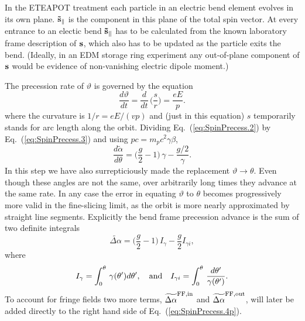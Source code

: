 \documentclass[]{article}
\begin{document}
In the ETEAPOT treatment each particle in an electric bend
element evolves in its own plane. 
${\bf \tilde s}_{\parallel}$ is the component in this plane of the total
spin vector. At every entrance to an electic bend ${\bf \tilde s}_{\parallel}$
has to be calculated from the known laboratory frame description
of ${\bf s}$, which also has to be updated as the particle exits
the bend. (Ideally, in an EDM storage ring experiment any out-of-plane
component of ${\bf s}$ would be evidence of non-vanishing electric dipole
moment.) 

The precession rate of $\vartheta$ is governed by the equation
%
\begin{equation}
\frac{d\vartheta}{dt}
 =
\frac{d}{dt}\,\bigg(\frac{s}{r}\bigg)
 =
\frac{eE}{p}.
\label{eq:SpinPrecess.3}
\end{equation}
%
where the curvature is $1/r=eE/(v p)$ and
(just in this equation) $s$ temporarily stands for arc
length along the orbit. Dividing Eq.~(\ref{eq:SpinPrecess.2})
by Eq.~(\ref{eq:SpinPrecess.3}) and using $pc=m_pc^2\gamma\beta$,
%
\begin{equation}
\boxed{
\frac{d\tilde\alpha}{d\theta}
 =
\bigg(
\frac{g}{2} - 1
\bigg)\,\gamma
 -\frac{g/2}{\gamma}
.
\label{eq:SpinPrecess.4}
}
\end{equation}
%
In this step we have also surrepticiously made the
replacement $\vartheta\rightarrow\theta$. Even though
these angles are not the same, over arbitrarily long
times they advance at the same rate. In any case the
error in equating $\vartheta$ to $\theta$
becomes progressively more valid in the fine-slicing 
limit, as the orbit is more nearly approximated by
straight line segments.
Explicitly the bend frame precession advance is the sum of two
definite integrals
%
\begin{equation}
\widetilde{\Delta\alpha}
 =
\bigg(
\frac{g}{2} - 1
\bigg)\,I_\gamma
 -
\frac{g}{2}I_{\gamma i},
\label{eq:SpinPrecess.4p}
\end{equation}
%
where 
%
\begin{equation}
I_\gamma = \int_0^{\theta}\,\gamma(\theta') d\theta',
\quad\hbox{and}\quad
I_{\gamma i} = \int_0^{\theta}\,\frac{d\theta'}{\gamma(\theta')}.
\label{eq:SpinPrecess.4q}
\end{equation}
%
To account for fringe fields two more
terms, $\widetilde{\Delta\alpha}^{\rm FF,in}$ and 
$\widetilde{\Delta\alpha}^{\rm FF,out}$, will later be added directly 
to the right hand side of Eq.~(\ref{eq:SpinPrecess.4p}).
\end{document}
